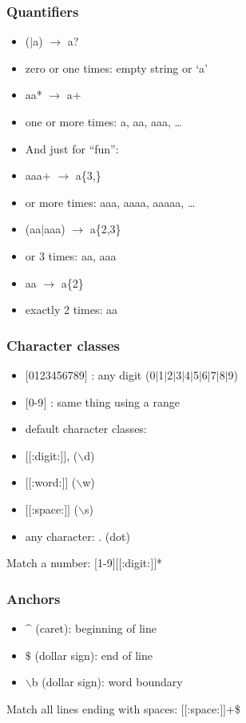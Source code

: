\documentclass[%
        hyperref={%
                pdfauthor={Zakariyya Mughal},%
                pdfpagemode={None},pdfpagelayout={SinglePage}}%
        xcolor={x11names},%
]{beamer}
\begin{document}
\begin{frame}
	\frametitle{Quantifiers}
	\begin{itemize}
		\item  (\(|\)a) \(\rightarrow\) a?
		\item[] \quad zero or one times: empty string or `a'
			\pause
		\item  aa* \(\rightarrow\) a+
		\item[] \quad one or more times: a, aa, aaa, \ldots
			\pause
		\item[] And just for ``fun'':
		\item  aaa+ \(\rightarrow\) a\{3,\}
		\item[]  or more times: aaa, aaaa, aaaaa, \ldots
			\pause
		\item  (aa\(|\)aaa) \(\rightarrow\) a\{2,3\}
		\item[]  or 3 times: aa, aaa
			\pause
		\item  aa \(\rightarrow\) a\{2\}
		\item[] \quad exactly 2 times: aa
	\end{itemize}
\end{frame}

\begin{frame}
	\frametitle{Character classes}
	\begin{itemize}
		\item $[$0123456789$]$ : any digit (0\(|\)1\(|\)2\(|\)3\(|\)4\(|\)5\(|\)6\(|\)7\(|\)8\(|\)9)
		\item $[$0-9$]$ : same thing using a range
		\item default character classes:
		\item[] \quad\quad $[[$:digit:$]]$, ($\backslash{}$d)
		\item[] \quad\quad $[[$:word:$]]$ ($\backslash{}$w)
		\item[] \quad\quad $[[$:space:$]]$ ($\backslash{}$s)
		\item any character: . (dot)
	\end{itemize}

	Match a number: $[$1-9$]$$[[$:digit:$]]$*
\end{frame}

\begin{frame}
	\frametitle{Anchors}
	\begin{itemize}
		\item \^{} (caret): beginning of line
		\item \(\$\) (dollar sign): end of line
		\item $\backslash{}$b (dollar sign): word boundary
	\end{itemize}

	Match all lines ending with spaces: $[[$:space:$]]$+\$
\end{frame}
\end{document}
